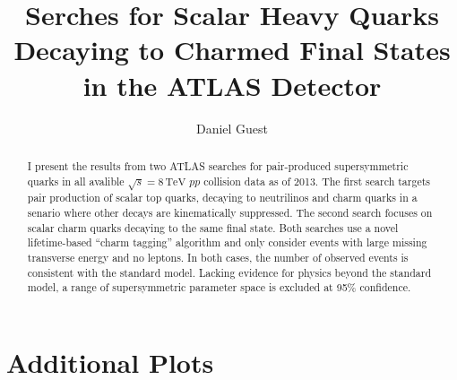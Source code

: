 \documentclass{report}
\title{Serches for Scalar Heavy Quarks Decaying to Charmed Final States in the ATLAS Detector}
\author{Daniel Guest}
\newcommand{\cmenergy}{\sqrt{s} = 8\,\text{TeV}}
\begin{document}
\maketitle
\tableofcontents

\begin{abstract}
I present the results from two ATLAS searches for pair-produced
supersymmetric quarks in all avalible $\cmenergy$ $pp$ collision data as
of 2013. The first search targets pair production of scalar top quarks,
decaying to neutrilinos and charm quarks in a senario where other
decays are kinematically suppressed. The second search focuses
on scalar charm quarks decaying to the same final state. Both searches
use a novel lifetime-based ``charm tagging'' algorithm
and only consider events with large missing transverse
energy and no leptons. In both cases, the number of observed events is
consistent with the standard model. Lacking evidence for physics
beyond the standard model, a range of supersymmetric parameter space is
excluded at 95\% confidence.
\end{abstract}





\appendix
\appendixpage
\addappheadtotoc

\chapter{Additional Plots}





\end{document}
